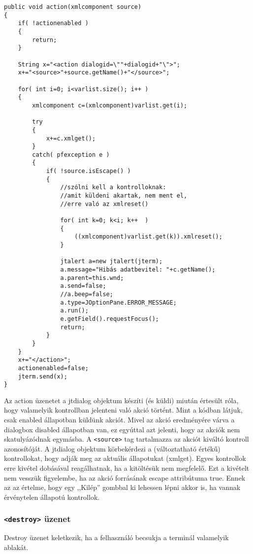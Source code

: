 \begin{verbatim}
public void action(xmlcomponent source)
{
    if( !actionenabled )
    {
        return;
    }

    String x="<action dialogid=\""+dialogid+"\">";
    x+="<source>"+source.getName()+"</source>";

    for( int i=0; i<varlist.size(); i++ )
    {
        xmlcomponent c=(xmlcomponent)varlist.get(i); 
        
        try
        {
            x+=c.xmlget();
        }
        catch( pfexception e )
        {
            if( !source.isEscape() )
            {
                //szólni kell a kontrolloknak:
                //amit küldeni akartak, nem ment el,
                //erre való az xmlreset()
 
                for( int k=0; k<i; k++  )
                {
                    ((xmlcomponent)varlist.get(k)).xmlreset();
                }

                jtalert a=new jtalert(jterm);
                a.message="Hibás adatbevitel: "+c.getName();
                a.parent=this.wnd;
                a.send=false;
                //a.beep=false;
                a.type=JOptionPane.ERROR_MESSAGE;
                a.run();
                e.getField().requestFocus();
                return;
            }
        }
    }
    x+="</action>";
    actionenabled=false;
    jterm.send(x);
}
\end{verbatim}

Az action üzenetet a jtdialog objektum készíti (és küldi) miután értesült
róla, hogy valamelyik kontrollban jelenteni való akció történt.
Mint a kódban látjuk, csak enabled állapotban küldünk akciót.
Mivel az akció eredményére várva a dialogbox disabled állapotban van,
ez egyúttal azt jelenti, hogy az akciók nem skatulyázódnak egymásba.
A \verb!<source>! tag tartalmazza az akciót kiváltó kontroll azonosítóját.
A jtdialog objektum körbekérdezi a (változtatható értékű) kontrollokat,
hogy adják meg az aktuális állapotukat (xmlget). Egyes kontrollok 
erre kivétel dobásával reagálhatnak, ha a kitöltésük nem megfelelő.
Ezt a kivételt nem vesszük figyelembe, ha az akció forrásának
escape attribútuma true. Ennek az az értelme, hogy egy ,,Kilép''
gombbal ki lehessen lépni akkor is, ha vannak érvénytelen
állapotú kontrollok.



\subsubsection{{\tt <destroy>} üzenet}
Destroy üzenet keletkezik, ha a felhasználó becsukja
a terminál valamelyik ablakát.
 

